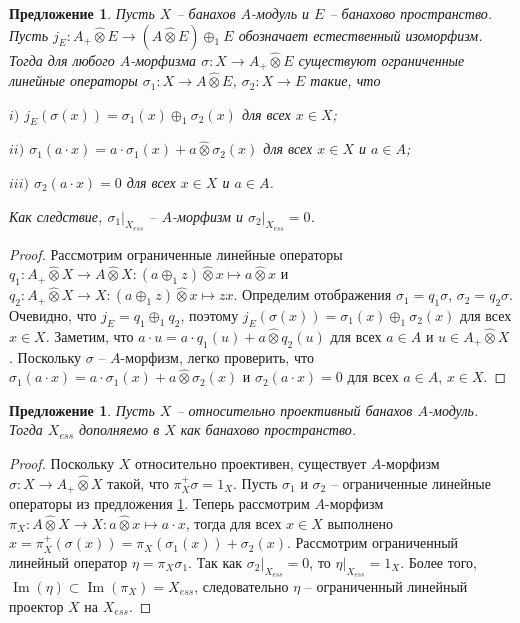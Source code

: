 \documentclass[12pt]{article}
\newtheorem{proposition}[theorem]{Предложение}
\newcommand{\projtens}{\mathbin{\widehat{\otimes}}}
\begin{document}
\begin{proposition}\label{MorphDecomp} Пусть $X$ -- банахов $A$-модуль и $E$ -- банахово пространство. Пусть $j_E:A_+\projtens E\to (A\projtens E)\oplus_1 E$ обозначает естественный изоморфизм. Тогда для любого $A$-морфизма $\sigma:X\to A_+\projtens E$ существуют ограниченные линейные операторы $\sigma_1:X\to A\projtens E$, $\sigma_2:X\to E$ такие, что

    $i)$ $j_E(\sigma(x))=\sigma_1(x)\oplus_1 \sigma_2(x)$ для всех $x\in X$;

    $ii)$ $\sigma_1(a\cdot x)=a\cdot \sigma_1(x)+a\projtens \sigma_2(x)$ для всех $x\in X$ и $a\in A$;

    $iii)$ $\sigma_2(a\cdot x)=0$ для всех $x\in X$ и $a\in A$.

    \noindent
    Как следствие, $\sigma_1|_{X_{ess}}$ -- $A$-морфизм и $\sigma_2|_{X_{ess}}=0$.

\end{proposition}
\begin{proof} Рассмотрим ограниченные линейные операторы
    $q_1:A_+\projtens X\to A\projtens X: (a\oplus_1 z)\projtens x\mapsto a\projtens x$ и
    $q_2:A_+\projtens X\to X: (a\oplus_1 z)\projtens x\mapsto z x$. Определим отображения $\sigma_1=q_1\sigma$, $\sigma_2=q_2\sigma$. Очевидно, что $j_E=q_1\oplus_1 q_2$, поэтому $j_E(\sigma(x))=\sigma_1(x)\oplus_1 \sigma_2(x)$ для всех $x\in X$. Заметим, что $a\cdot u=a\cdot q_1(u)+a\projtens q_2(u)$ для всех $a\in A$ и $u\in A_+\projtens X$. Поскольку $\sigma$ -- $A$-морфизм, легко проверить, что $\sigma_1(a\cdot x)=a\cdot \sigma_1(x)+a\projtens \sigma_2(x)$ и $\sigma_2(a\cdot x)=0$ для всех $a\in A$, $x\in X$.
\end{proof}

\begin{proposition}\label{ProjModEssPartCompl} Пусть $X$ -- относительно проективный банахов $A$-модуль. Тогда $X_{ess}$ дополняемо в $X$ как банахово пространство.
\end{proposition}
\begin{proof} Поскольку $X$ относительно проективен, существует $A$-морфизм $\sigma:X\to A_+\projtens X$ такой, что $\pi_X^+\sigma=1_X$. Пусть $\sigma_1$ и $\sigma_2$ -- ограниченные линейные операторы из предложения \ref{MorphDecomp}. Теперь рассмотрим $A$-морфизм $\pi_X:A\projtens X\to X:a\projtens x\mapsto a\cdot x$, тогда для всех $x\in X$ выполнено $x=\pi_X^+(\sigma(x))=\pi_X(\sigma_1(x)) + \sigma_2(x)$. Рассмотрим ограниченный линейный оператор $\eta = \pi_X\sigma_1$. Так как $\sigma_2|_{X_{ess}}=0$, то $\eta|_{X_{ess}}=1_X$. Более того, $\operatorname{Im}(\eta)\subset\operatorname{Im}(\pi_X)=X_{ess}$, следовательно $\eta$ -- ограниченный линейный проектор $X$ на $X_{ess}$.
\end{proof}
\end{document}
